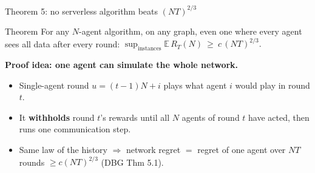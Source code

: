 \documentclass[11pt]{beamer}
\begin{document}
\begin{frame}{Theorem 5: no serverless algorithm beats $(NT)^{2/3}$}
\footnotesize
\begin{block}{Theorem}
For any $N$-agent algorithm, on any graph, even one where every agent sees all data after every round:\quad
$\displaystyle\sup_{\text{instances}}\mathbb E\,R_T(N)\ \ge\ c\,(NT)^{2/3}.$
\end{block}
\textbf{Proof idea: one agent can simulate the whole network.}
\begin{center}
\end{center}
\begin{itemize}
\item Single-agent round $u=(t-1)N+i$ plays what agent $i$ would play in round $t$.
\item It \textbf{withholds} round $t$'s rewards until all $N$ agents of round $t$ have acted, then runs one communication step.
\item Same law of the history $\Rightarrow$ network regret $=$ regret of one agent over $NT$ rounds $\ge c(NT)^{2/3}$ (DBG Thm 5.1).
\end{itemize}
\end{frame}
\end{document}
